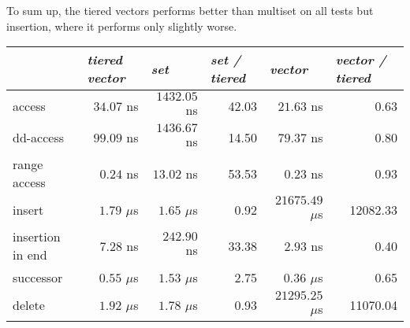 To sum up, the tiered vectors performs better than multiset on all tests
but insertion, where it performs only slightly worse.

\begin{table}
	\centering
	\begin{tabular}{|l|r|r|r|r|r|}
		\hline
		& \multicolumn{1}{l|}{\textit{tiered vector}} & \multicolumn{1}{l|}{\textit{set}} & \multicolumn{1}{l|}{\textit{set / tiered}} & \multicolumn{1}{l|}{\textit{vector}} & \multicolumn{1}{l|}{\textit{vector / tiered}} \\ \hline
		access     & $34.07$ ns                                  & $1432.05$ ns                      & 42.03                                      & $21.63$ ns                           & 0.63                                          \\ \hline
		dd-access    & $99.09$ ns                                  & $1436.67$ ns                      & 14.50                                      & $79.37$ ns                           & 0.80                                          \\ \hline
		range access   & $0.24$ ns                                   & $13.02$ ns                        & 53.53                                      & $0.23$ ns                            & 0.93                                          \\ \hline
		insert   & $1.79$ $\mu$s                               & $1.65$ $\mu$s                     & 0.92                                       & $21675.49$ $\mu$s                     & 12082.33                                      \\ \hline
		insertion in end     & $7.28$ ns                               & $242.90$ ns                     & 33.38                                       & $2.93$ ns                     & 0.40                                      \\ \hline
		successor & $0.55$ $\mu$s                               & $1.53$ $\mu$s                     & 2.75                                       & $0.36$ $\mu$s                        & 0.65                                          \\ \hline
		delete     & $1.92$ $\mu$s                               & $1.78$ $\mu$s                     & 0.93                                       & $21295.25$ $\mu$s                     & 11070.04                                      \\ \hline

\end{tabular}
\end{table}
